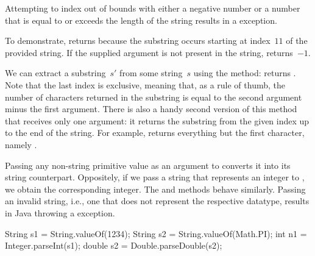 Attempting to index out of bounds with either a negative number or a number that is equal to or exceeds the length of the string results in a  exception.

To demonstrate,  returns  because the substring  occurs starting at index~$11$ of the provided string. 
If the supplied argument is not present in the string,  returns~$-1$.

We can extract a substring~$s'$ from some string~$s$ using the  method:  returns . 
Note that the last index is exclusive, meaning that, as a rule of thumb, the number of characters returned in the substring is equal to the second argument minus the first argument. 
There is also a handy second version of this method that receives only one argument: it returns the substring from the given index up to the end of the string. 
For example,  returns everything but the first character, namely .

Passing any non-string primitive value as an argument to  converts it into its string counterpart.
Oppositely, if we pass a string that represents an integer to , we obtain the corresponding integer. 
The  and  methods behave similarly. 
Passing an invalid string, i.e., one that does not represent the respective datatype, results in Java throwing a  exception.

\begin{verbnobox}[\small]
String s1 = String.valueOf(1234);
String s2 = String.valueOf(Math.PI);
int n1 = Integer.parseInt(s1);
double s2 = Double.parseDouble(s2);
\end{verbnobox}


